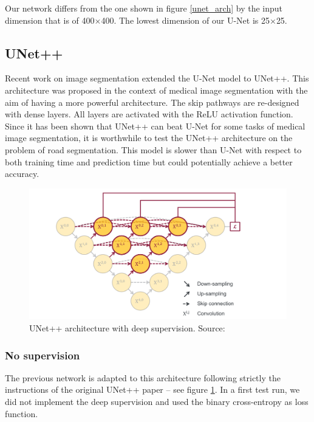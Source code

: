 \documentclass[10pt,conference,a4paper]{IEEEtran}
\begin{document}
Our network differs from the one shown in figure \ref{unet_arch} by the input dimension that is of 400$\times$400. 
The lowest dimension of our U-Net is 25$\times$25.

\subsection{UNet++}

Recent work on image segmentation extended the U-Net model to UNet++.
This architecture was proposed in the context of medical image segmentation with the aim of having a more powerful architecture.
The skip pathways are re-designed with dense layers. 
All layers are activated with the ReLU activation function.
Since it has been shown that UNet++ can beat U-Net for some tasks of medical image segmentation, it is worthwhile to test the UNet++ architecture on the problem of road segmentation. 
This model is slower than U-Net with respect to both training time and prediction time but could potentially achieve a better accuracy.

\begin{figure}[ht]
\centering
\includegraphics[scale=0.2]{project2/report/images/UNet++.PNG}
\caption{UNet++ architecture with deep supervision. Source: \cite{unet++}}
\label{unet++_arch}
\end{figure}

\subsubsection{No supervision}

The previous network is adapted to this architecture following strictly the instructions of the original UNet++ paper -- see figure \ref{unet++_arch}.
In a first test run, we did not implement the deep supervision and used the binary cross-entropy as loss function.
\end{document}
